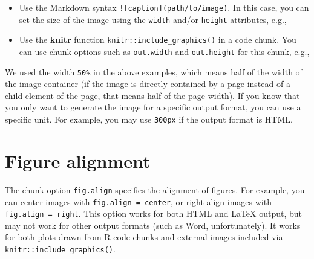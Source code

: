 \documentclass[
  11pt,
]{krantz}
\newenvironment{Shaded}{\begin{snugshade}}{\end{snugshade}}
\newcommand{\AlertTok}[1]{\textcolor[rgb]{0.33,0.33,0.33}{#1}}
\newcommand{\BaseNTok}[1]{\textcolor[rgb]{0.06,0.06,0.06}{#1}}
\newcommand{\NormalTok}[1]{#1}
\begin{document}
\begin{itemize}
\item
  Use the Markdown syntax \texttt{!{[}caption{]}(path/to/image)}. In this case, you can set the size of the image using the \texttt{width} and/or \texttt{height} attributes, e.g.,

\begin{Shaded}
\end{Shaded}
\item
  Use the \textbf{knitr} function \texttt{knitr::include\_graphics()} in a code chunk. You can use chunk options such as \texttt{out.width} and \texttt{out.height} for this chunk, e.g.,

\begin{Shaded}
\end{Shaded}
\end{itemize}

We used the width \texttt{50\%} in the above examples, which means half of the width of the image container (if the image is directly contained by a page instead of a child element of the page, that means half of the page width). If you know that you only want to generate the image for a specific output format, you can use a specific unit. For example, you may use \texttt{300px} if the output format is HTML.

\hypertarget{fig-align}{%
\section{Figure alignment}\label{fig-align}}

The chunk option \texttt{fig.align} specifies the alignment of figures. For example, you can center images with \texttt{fig.align\ =\ \textquotesingle{}center\textquotesingle{}}, or right-align images with \texttt{fig.align\ =\ \textquotesingle{}right\textquotesingle{}}. This option works for both HTML and LaTeX output, but may not work for other output formats (such as Word, unfortunately). It works for both plots drawn from R code chunks and external images included via \texttt{knitr::include\_graphics()}.
\end{document}

